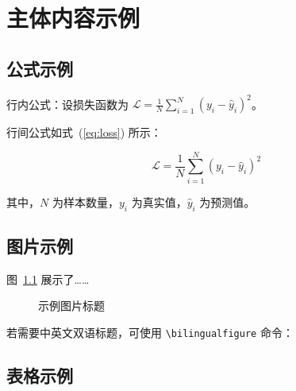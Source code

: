 
\chapter{主体内容示例}

\section{公式示例}

行内公式：设损失函数为 $\mathcal{L} = \frac{1}{N}\sum_{i=1}^{N}(y_i - \hat{y}_i)^2$。

行间公式如式~(\ref{eq:loss}) 所示：

\begin{equation}
    \mathcal{L} = \frac{1}{N}\sum_{i=1}^{N}\left(y_i - \hat{y}_i\right)^2
    \label{eq:loss}
\end{equation}

其中，$N$ 为样本数量，$y_i$ 为真实值，$\hat{y}_i$ 为预测值。

\section{图片示例}

图~\ref{fig:example} 展示了……

\begin{figure}[htbp]
    \centering
    \caption{示例图片标题}
    \label{fig:example}
\end{figure}

若需要中英文双语标题，可使用 \verb|\bilingualfigure| 命令：

\begin{figure}[htbp]
    \label{fig:bilingual}
\end{figure}

\section{表格示例}

